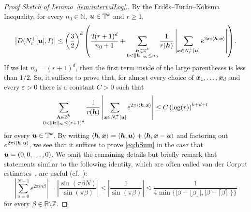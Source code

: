 \documentclass[12pt,a4paper]{amsart}
\numberwithin{equation}{section}
\theoremstyle{definition}
\begin{document}
\begin{proof}[Proof Sketch of Lemma~\ref{lem:intervalLog}.]
By the Erd\H{o}s--Tur\'{a}n--Koksma Inequality, for every $n_0\in\mathbb{N}$, $\boldsymbol{u}\in\mathbb{T}^k$ and $r\geq1$, 
\[\left|D(N_r^+[\boldsymbol{u}],I)\right|\leq \left(\frac{3}{2}\right)^k\left(\frac{2(r+1)^d}{n_0+1} + \sum_{\substack{\boldsymbol{h}\in \mathbb{Z}^k\\ 0<\|\boldsymbol{h}\|_\infty\leq n_0}}\frac{1}{r(\boldsymbol{h})}\left|\sum_{\boldsymbol{x}\in N_r^+[\boldsymbol{u}]}e^{2\pi i \langle \boldsymbol{h},\boldsymbol{x}\rangle}\right|\right).\]
If we let $n_0=(r+1)^d$, then the first term inside of the large parentheses is less than $1/2$. So, it suffices to prove that, for almost every choice of $\boldsymbol{x}_1,\dots,\boldsymbol{x}_d$ and every $\varepsilon>0$ there is a constant $C>0$ such that
\begin{equation}\label{eq:hSum}\sum_{\substack{\boldsymbol{h}\in \mathbb{Z}^k\\ 0<\|\boldsymbol{h}\|_\infty\leq (r+1)^d}}\frac{1}{r(\boldsymbol{h})}\left|\sum_{\boldsymbol{x}\in N_r^+[\boldsymbol{u}]}e^{2\pi i \langle \boldsymbol{h},\boldsymbol{x}\rangle}\right| \leq C\left(\log(r)\right)^{k+d+t}
\end{equation}
for every $\boldsymbol{u}\in \mathbb{T}^k$. By writing $\langle \boldsymbol{h},\boldsymbol{x}\rangle = \langle \boldsymbol{h},\boldsymbol{u}\rangle+\langle \boldsymbol{h},\boldsymbol{x}-\boldsymbol{u}\rangle$ and factoring out $e^{2\pi i \langle \boldsymbol{h},\boldsymbol{u}\rangle}$, we see that it suffices to prove \eqref{eq:hSum} in the case that $\boldsymbol{u}=(0,0,\dots,0)$. We omit the remaining details but briefly remark that statements similar to the following identity, which are often called van der Corput estimates~\cite[Chapter~2]{GrahamKolesnik91}, are useful (cf.~\cite[p.~152]{TomkowiczWagon16}):
\[\left|\sum_{n=0}^{N-1}e^{2\pi i n\beta}\right|=\left|\frac{\sin(\pi\beta N)}{\sin(\pi\beta)}\right| \leq \left|\frac{1}{\sin(\pi\beta)}\right|\leq\frac{1}{4\min\{|\beta-\lfloor \beta\rfloor|,|\beta-\lceil \beta\rceil|\}\}}\]
for every $\beta\in\mathbb{R}\setminus \mathbb{Z}$. 
\end{proof} 
\end{document}
